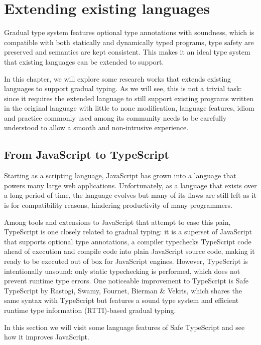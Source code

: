 
\renewcommand{\thechapter}{2}

\chapter{Extending existing languages}

Gradual type system features optional type annotations with soundness,
which is compatible with both statically and dynamically typed programs,
type safety are preserved and semantics are kept consistent.
This makes it an ideal type system that
existing languages can be extended to support.

In this chapter, we will explore some research works that extends existing languages
to support gradual typing. As we will see, this is not a trivial task:
since it requires the extended language to still support existing programs written
in the original language with little to none modification,
language features, idiom and practice commonly used among its community
needs to be carefully understood to allow a smooth and non-intrusive experience.

\section{From JavaScript to TypeScript}

Starting as a scripting language, JavaScript has grown into a language
that powers many large web applications.
Unfortunately, as a language that exists over a long period of time,
the language evolves but many of its flaws are still left as it is for compatibility reasons,
hindering productivity of many programmers.

Among tools and extensions to JavaScript that attempt to ease this pain,
TypeScript is one closely related to gradual typing:
it is a superset of JavaScript that supports optional type annotations,
a compiler typechecks TypeScript code ahead of execution and compile code
into plain JavaScript source code, making it ready to be executed out of box
for JavaScript engines.
However, TypeScript is intentionally unsound: only static typechecking is performed,
which does not prevent runtime type errors.
One noticeable improvement to TypeScript is Safe TypeScript by Rastogi, Swamy, Fournet, Bierman \& Vekris, which shares the same syntax with TypeScript
but features a sound type system and efficient runtime type information (RTTI)-based
gradual typing.

In this section we will visit some language features of Safe TypeScript and see how it improves JavaScript.

